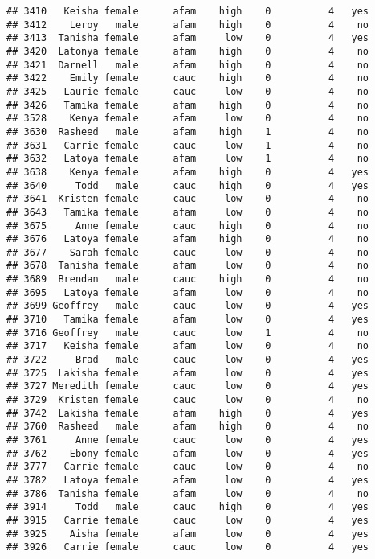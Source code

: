 \documentclass[
]{article}
\begin{document}
\begin{verbatim}
## 3410   Keisha female      afam    high    0          4   yes
## 3412    Leroy   male      afam    high    0          4    no
## 3413  Tanisha female      afam     low    0          4   yes
## 3420  Latonya female      afam    high    0          4    no
## 3421  Darnell   male      afam    high    0          4    no
## 3422    Emily female      cauc    high    0          4    no
## 3425   Laurie female      cauc     low    0          4    no
## 3426   Tamika female      afam    high    0          4    no
## 3528    Kenya female      afam     low    0          4    no
## 3630  Rasheed   male      afam    high    1          4    no
## 3631   Carrie female      cauc     low    1          4    no
## 3632   Latoya female      afam     low    1          4    no
## 3638    Kenya female      afam    high    0          4   yes
## 3640     Todd   male      cauc    high    0          4   yes
## 3641  Kristen female      cauc     low    0          4    no
## 3643   Tamika female      afam     low    0          4    no
## 3675     Anne female      cauc    high    0          4    no
## 3676   Latoya female      afam    high    0          4    no
## 3677    Sarah female      cauc     low    0          4    no
## 3678  Tanisha female      afam     low    0          4    no
## 3689  Brendan   male      cauc    high    0          4    no
## 3695   Latoya female      afam     low    0          4    no
## 3699 Geoffrey   male      cauc     low    0          4   yes
## 3710   Tamika female      afam     low    0          4   yes
## 3716 Geoffrey   male      cauc     low    1          4    no
## 3717   Keisha female      afam     low    0          4    no
## 3722     Brad   male      cauc     low    0          4   yes
## 3725  Lakisha female      afam     low    0          4   yes
## 3727 Meredith female      cauc     low    0          4   yes
## 3729  Kristen female      cauc     low    0          4    no
## 3742  Lakisha female      afam    high    0          4   yes
## 3760  Rasheed   male      afam    high    0          4    no
## 3761     Anne female      cauc     low    0          4   yes
## 3762    Ebony female      afam     low    0          4   yes
## 3777   Carrie female      cauc     low    0          4    no
## 3782   Latoya female      afam     low    0          4   yes
## 3786  Tanisha female      afam     low    0          4    no
## 3914     Todd   male      cauc    high    0          4   yes
## 3915   Carrie female      cauc     low    0          4   yes
## 3925    Aisha female      afam     low    0          4   yes
## 3926   Carrie female      cauc     low    0          4   yes

\end{verbatim}
\end{document}
